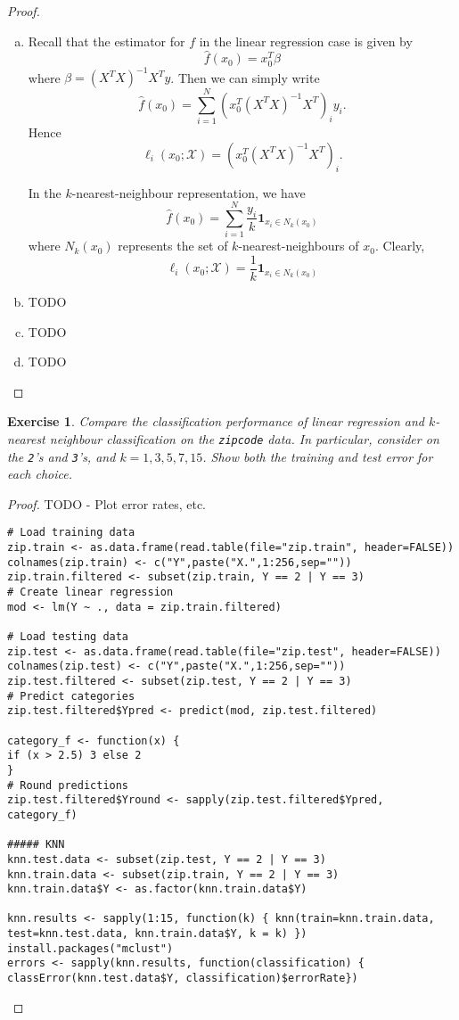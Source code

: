 \documentclass[12pt]{amsart}
\theoremstyle{plain}%
\newtheorem{exer}[thm]{Exercise}
\theoremstyle{definition}
\theoremstyle{remark}
\begin{document}
\begin{proof}
    \begin{enumerate}[(a)]
        \item Recall that the estimator for $f$ in the linear regression case is given by \[
            \hat f(x_0) = x_0^T \beta 
        \] where $\beta = (X^T X)^{-1} X^T y$.  Then we can simply write \[
            \hat f(x_0) = \sum_{i=1}^N \left( x_0^T (X^T X)^{-1} X^T \right)_i y_i.
        \]  Hence \[
            \ell_i(x_0; \mathcal X) = \left( x_0^T (X^T X)^{-1} X^T \right)_i.
        \]
        
        In the $k$-nearest-neighbour representation, we have \[
            \hat f(x_0) = \sum_{i=1}^N \frac{y_i}{k} \mathbf{1}_{x_i \in N_k(x_0)}
        \] where $N_k(x_0)$ represents the set of $k$-nearest-neighbours of $x_0$.  Clearly, \[
            \ell_i(x_0; \mathcal X) = \frac{1}{k} \mathbf{1}_{x_i \in N_k(x_0)}
        \]
        \item TODO
        \item TODO
        \item TODO
    \end{enumerate}
\end{proof}

\begin{exer}
    Compare the classification performance of linear regression and $k$-nearest neighbour classification on the \texttt{zipcode} data.  In particular, consider on the \texttt{2}'s and \texttt{3}'s, and $k = 1, 3, 5, 7, 15$.  Show both the training and test error for each choice.
\end{exer}

\begin{proof}
    TODO - Plot error rates, etc.
    
\begin{lstlisting}
# Load training data
zip.train <- as.data.frame(read.table(file="zip.train", header=FALSE))
colnames(zip.train) <- c("Y",paste("X.",1:256,sep=""))
zip.train.filtered <- subset(zip.train, Y == 2 | Y == 3)
# Create linear regression
mod <- lm(Y ~ ., data = zip.train.filtered)

# Load testing data
zip.test <- as.data.frame(read.table(file="zip.test", header=FALSE))
colnames(zip.test) <- c("Y",paste("X.",1:256,sep=""))
zip.test.filtered <- subset(zip.test, Y == 2 | Y == 3)
# Predict categories
zip.test.filtered$Ypred <- predict(mod, zip.test.filtered)

category_f <- function(x) {
if (x > 2.5) 3 else 2
}
# Round predictions
zip.test.filtered$Yround <- sapply(zip.test.filtered$Ypred, category_f)

##### KNN
knn.test.data <- subset(zip.test, Y == 2 | Y == 3)
knn.train.data <- subset(zip.train, Y == 2 | Y == 3)
knn.train.data$Y <- as.factor(knn.train.data$Y)

knn.results <- sapply(1:15, function(k) { knn(train=knn.train.data, test=knn.test.data, knn.train.data$Y, k = k) })
install.packages("mclust")
errors <- sapply(knn.results, function(classification) { classError(knn.test.data$Y, classification)$errorRate})
\end{lstlisting}
    
\end{proof}
\end{document}
